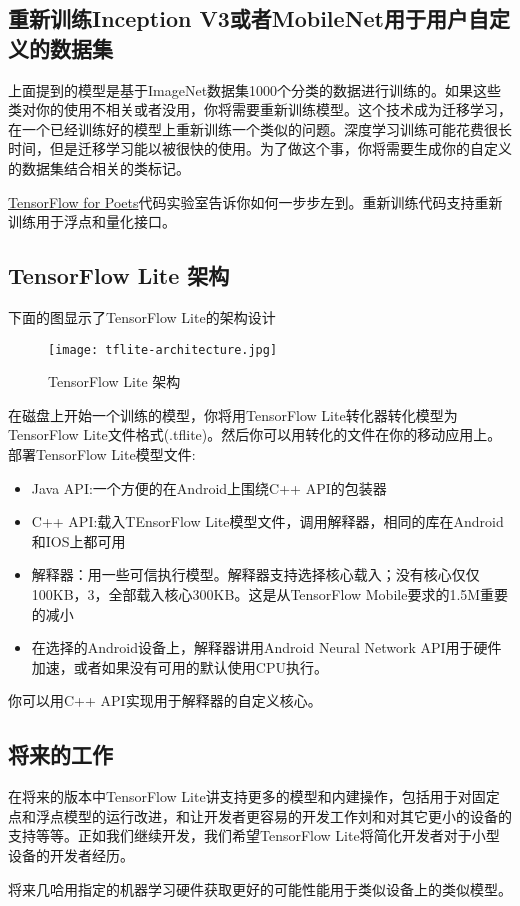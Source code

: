 \subsection{重新训练Inception V3或者MobileNet用于用户自定义的数据集}
上面提到的模型是基于ImageNet数据集1000个分类的数据进行训练的。如果这些类对你的使用不相关或者没用，你将需要重新训练模型。这个技术成为迁移学习，在一个已经训练好的模型上重新训练一个类似的问题。深度学习训练可能花费很长时间，但是迁移学习能以被很快的使用。为了做这个事，你将需要生成你的自定义的数据集结合相关的类标记。

\href{https://codelabs.developers.google.com/codelabs/tensorflow-for-poets/?hl=zh-cn}{TensorFlow for Poets}代码实验室告诉你如何一步步左到。重新训练代码支持重新训练用于浮点和量化接口。
\subsection{TensorFlow Lite 架构}
下面的图显示了TensorFlow Lite的架构设计
\begin{figure}[H]
\centering
\texttt{[image: tflite-architecture.jpg]}
\caption{TensorFlow Lite 架构}
\end{figure}
在磁盘上开始一个训练的模型，你将用TensorFlow Lite转化器转化模型为TensorFlow Lite文件格式(.tflite)。然后你可以用转化的文件在你的移动应用上。
部署TensorFlow Lite模型文件:
\begin{itemize}
\item Java API:一个方便的在Android上围绕C++ API的包装器
\item C++ API:载入TEnsorFlow Lite模型文件，调用解释器，相同的库在Android和IOS上都可用
\item 解释器：用一些可信执行模型。解释器支持选择核心载入；没有核心仅仅100KB，3，全部载入核心300KB。这是从TensorFlow Mobile要求的1.5M重要的减小
\item 在选择的Android设备上，解释器讲用Android Neural Network API用于硬件加速，或者如果没有可用的默认使用CPU执行。
\end{itemize}
你可以用C++ API实现用于解释器的自定义核心。
\subsection{将来的工作}
在将来的版本中TensorFlow Lite讲支持更多的模型和内建操作，包括用于对固定点和浮点模型的运行改进，和让开发者更容易的开发工作刘和对其它更小的设备的支持等等。正如我们继续开发，我们希望TensorFlow Lite将简化开发者对于小型设备的开发者经历。

将来几哈用指定的机器学习硬件获取更好的可能性能用于类似设备上的类似模型。

